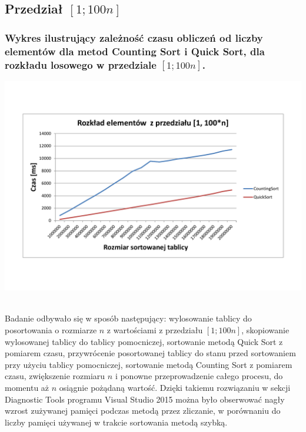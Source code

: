 \documentclass[polish,polish,a4paper]{article}
\begin{document}
\begin{spacing}{1.5}
\subsection{Przedział $[1;100n]$}

\subsubsection*{Wykres ilustrujący zależność czasu obliczeń od liczby elementów dla metod Counting Sort i  Quick Sort, dla rozkładu losowego w przedziale $[1;100n]$.}

\begin{minipage}[H]{\textwidth}
	\begin{center}
		\includegraphics[scale=0.6]{zad4100n.pdf}
		\label{fig:zad4100n}
	\end{center}
\end{minipage}\\

Badanie odbywało się w sposób następujący: wylosowanie tablicy do posortowania o rozmiarze $n$ z wartościami z przedziału $[1;100n]$, skopiowanie wylosowanej tablicy do tablicy pomocniczej, sortowanie metodą Quick Sort z pomiarem czasu, przywrócenie posortowanej tablicy do stanu przed sortowaniem przy użyciu tablicy pomocniczej, sortowanie metodą Counting Sort z pomiarem czasu, zwiększenie rozmiaru $n$ i ponowne przeprowadzenie całego procesu, do momentu aż $n$ osiągnie pożądaną wartość.	Dzięki takiemu rozwiązaniu w sekcji Diagnostic Tools programu Visual Studio 2015 można było obserwować nagły wzrost zużywanej pamięci podczas metodą przez zliczanie, w porównaniu do liczby pamięci używanej w trakcie sortowania metodą szybką. 


\end{spacing}
\end{document}
